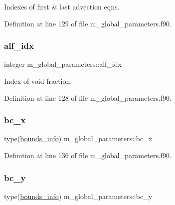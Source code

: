 Indexes of first \& last advection eqns. 



Definition at line 129 of file m\+\_\+global\+\_\+parameters.\+f90.

\mbox{\label{namespacem__global__parameters_af451fa7762c859ef20552498fa6edb16}} 
\subsubsection{\texorpdfstring{alf\+\_\+idx}{alf\_idx}}
{\footnotesize\ttfamily integer m\+\_\+global\+\_\+parameters\+::alf\+\_\+idx}



Index of void fraction. 



Definition at line 128 of file m\+\_\+global\+\_\+parameters.\+f90.

\mbox{\label{namespacem__global__parameters_aa46a7f3638e49fa9ec33ea859b9e6a5a}} 
\subsubsection{\texorpdfstring{bc\+\_\+x}{bc\_x}}
{\footnotesize\ttfamily type(\hyperlink{structm__derived__types_1_1bounds__info}{bounds\+\_\+info}) m\+\_\+global\+\_\+parameters\+::bc\+\_\+x}



Definition at line 136 of file m\+\_\+global\+\_\+parameters.\+f90.

\mbox{\label{namespacem__global__parameters_a68eaaca2982b39252417b29ef5d0f9c3}} 
\subsubsection{\texorpdfstring{bc\+\_\+y}{bc\_y}}
{\footnotesize\ttfamily type(\hyperlink{structm__derived__types_1_1bounds__info}{bounds\+\_\+info}) m\+\_\+global\+\_\+parameters\+::bc\+\_\+y}



